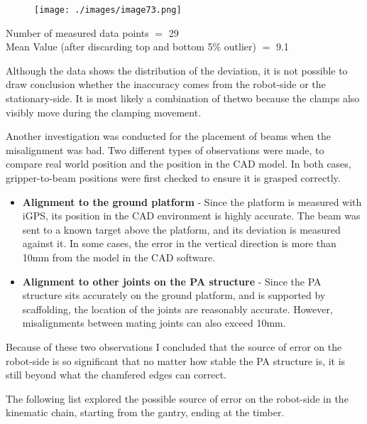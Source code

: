 {\footnotesize \begin{figure}[H]
\texttt{[image: ./images/image73.png]}
\end{figure}
}

{\footnotesize Number of measured data points $=$ 29 \\ Mean Value (after discarding top and bottom 5$\%$ outlier) $=$ 9.1}

Although the data shows the distribution of the deviation, it is not possible to draw conclusion whether the inaccuracy comes from the robot-side or the stationary-side. It is most likely a combination of thetwo because the clamps also visibly move during the clamping movement. 


Another investigation was conducted for the placement of beams when the misalignment was bad. Two different types of observations were made, to compare real world position and the position in the CAD model. In both cases, gripper-to-beam positions were first checked to ensure it is grasped correctly.

\begin{itemize}
	\item \textbf{Alignment to the ground platform} - Since the platform is measured with iGPS, its position in the CAD environment is highly accurate. The beam was sent to a known target above the platform, and its deviation is measured against it. In some cases, the error in the vertical direction is more than 10mm from the model in the CAD software. 

	\item \textbf{Alignment to other joints on the PA structure} - Since the PA structure sits accurately on the ground platform, and is supported by scaffolding, the location of the joints are reasonably accurate. However, misalignments between mating joints can also exceed 10mm. 

\end{itemize}
Because of these two observations I concluded that the source of error on the robot-side is so significant that no matter how stable the PA structure is, it is still beyond what the chamfered edges can correct. 

The following list explored the possible source of error on the robot-side in the kinematic chain, starting from the gantry, ending at the timber.

